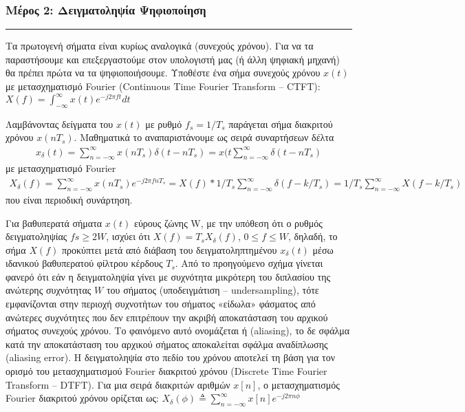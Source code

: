 \documentclass[letterpaper,10pt,english]{sphinxmanual}
\begin{document}
\subsubsection*{Μέρος 2:  Δειγματοληψία \sphinxhyphen{} Ψηφιοποίηση}
\label{\detokenize{Exercise1_2:id1}}\label{\detokenize{Exercise1_2::doc}}

\bigskip\hrule\bigskip


\sphinxAtStartPar
Τα πρωτογενή σήματα είναι κυρίως αναλογικά (συνεχούς χρόνου). Για να τα παραστήσουμε και επεξεργαστούμε στον υπολογιστή μας (ή άλλη ψηφιακή μηχανή) θα πρέπει πρώτα να τα ψηφιοποιήσουμε. Υποθέστε ένα σήμα συνεχούς χρόνου \(x(t)\) με μετασχηματισμό Fourier (Continuous Time Fourier Transform – CTFT):
\(X(f)=\int_{-\infty}^{\infty} x(t)e^{-j2\pi ft} dt\)

\sphinxAtStartPar
Λαμβάνοντας δείγματα του \(x(t)\) με ρυθμό \(f_s=1/T_s\) παράγεται σήμα διακριτού χρόνου \(x(nT_s)\). Μαθηματικά το αναπαριστάνουμε ως σειρά συναρτήσεων δέλτα
\begin{equation*}
\begin{split}x_\delta (t)=\sum_{n=-\infty}^{\infty}x(nT_s)\delta(t-nT_s)=x(t\sum_{n=-\infty}^{\infty}\delta(t-nT_s)\end{split}
\end{equation*}
\sphinxAtStartPar
με μετασχηματισμό Fourier
\begin{equation*}
\begin{split}X_\delta (f)=\sum_{n=-\infty}^{\infty}x(nT_s)e^{-j2\pi fnT_s}=X(f)*1/T_s\sum_{n=-\infty}^{\infty}\delta(f-k/T_s)=1/T_s\sum_{n=-\infty}^{\infty}X(f-k/T_s)\end{split}
\end{equation*}
\sphinxAtStartPar
που είναι περιοδική συνάρτηση.
\newline
{}

\sphinxAtStartPar
Για βαθυπερατά σήματα \(x(t)\) εύρους ζώνης W, με την υπόθεση ότι ο ρυθμός δειγματοληψίας \(fs ≥
2W\), ισχύει ότι \(X(f) = T_s X_\delta(f)\), \(0 ≤ f ≤ W\), δηλαδή, το σήμα \(X(f)\) προκύπτει μετά από διάβαση του
δειγματοληπτημένου \(x_\delta(t)\) μέσω ιδανικού βαθυπερατού φίλτρου κέρδους \(T_s\). Από το προηγούμενο
σχήμα γίνεται φανερό ότι εάν η δειγματοληψία γίνει με συχνότητα μικρότερη του διπλασίου της
ανώτερης συχνότητας \(W\) του σήματος (υποδειγμάτιση – undersampling), τότε εμφανίζονται στην
περιοχή συχνοτήτων του σήματος «είδωλα» φάσματος από ανώτερες συχνότητες που δεν
επιτρέπουν την ακριβή αποκατάσταση του αρχικού σήματος συνεχούς χρόνου. Το φαινόμενο αυτό
ονομάζεται  ή  (aliasing), το δε σφάλμα κατά την αποκατάσταση του
αρχικού σήματος αποκαλείται σφάλμα αναδίπλωσης (aliasing error).
Η δειγματοληψία στο πεδίο του χρόνου αποτελεί τη βάση για τον ορισμό του μετασχηματισμού
Fourier διακριτού χρόνου (Discrete Time Fourier Transform – DTFT). Για μια σειρά διακριτών
αριθμών \(x[n]\), ο μετασχηματισμός Fourier διακριτού χρόνου ορίζεται ως:
\(X_\delta (\phi)\triangleq\sum_{n=-\infty}^{\infty}x[n]e^{-j2\pi n\phi}\)
\end{document}
